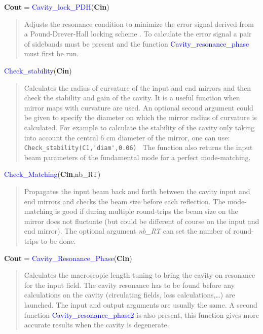 \noindent \textbf{Cout} = \textcolor{blue}{Cavity\_lock\_PDH}(\textbf{Cin})
\vspace*{-0.2cm}
\begin{quote}
Adjusts the resonance condition to minimize the error signal derived from a Pound-Drever-Hall locking scheme \cite{black:79}. To calculate the error signal a pair of sidebands must be present and the function \textcolor{blue}{Cavity\_resonance\_phase} must first be run.
\end{quote}

\noindent \textcolor{blue}{Check\_stability}(\textbf{Cin})
\vspace*{-0.2cm}
\begin{quote}
Calculates the radius of curvature of the input and end mirrors and then check the stability and gain of the cavity. It is a useful function when mirror maps with curvature are used. An optional second argument could be given to specify the diameter on which the mirror radius of curvature is calculated. For example to calculate the stability of the cavity only taking into account the central 6 cm diameter of the mirror, one can use:
\verb? Check_stability(C1,'diam',0.06) ?
The function also returns the input beam parameters of the fundamental mode for a perfect mode-matching.

\end{quote}

\noindent \textcolor{blue}{Check\_Matching}(\textbf{Cin},nb\_RT)
\vspace*{-0.2cm}
\begin{quote}
Propagates the input beam back and forth between the cavity input and end mirrors and checks the beam size before each reflection. The mode-matching is good if during multiple round-trips the beam size on the mirror does not fluctuate (but could be different of course on the input and end mirror). The optional argument \textsl{nb\_RT} can set the number of round-trips to be done.
\end{quote}

\noindent \textbf{Cout} = \textcolor{blue}{Cavity\_Resonance\_Phase}(\textbf{Cin})
\vspace*{-0.2cm}
\begin{quote}
Calculates the macroscopic length tuning to bring the cavity on resonance for the input field. The cavity resonance has to be found before any calculations on the cavity (circulating fields, loss calculations,\dots) are launched. The input and output arguments are usually the same.
A second function \textcolor{blue}{Cavity\_resonance\_phase2} is also present, this function gives more accurate results when the cavity is degenerate.
\end{quote}

